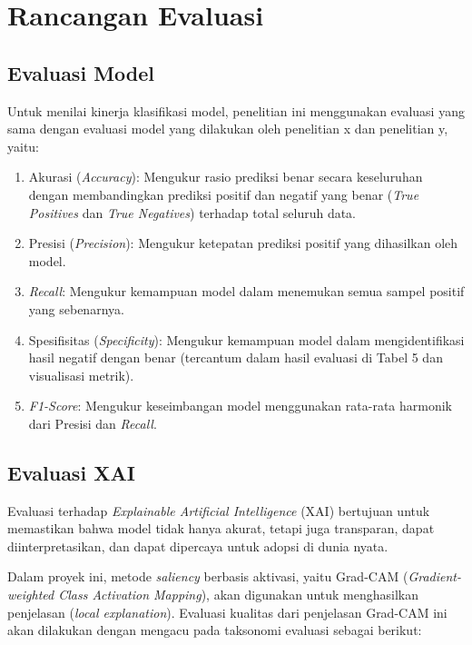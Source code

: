\section{Rancangan Evaluasi}
\subsection{Evaluasi Model}
Untuk menilai kinerja klasifikasi model, penelitian ini menggunakan evaluasi yang sama dengan evaluasi model yang dilakukan oleh penelitian x dan penelitian y, yaitu:

\begin{enumerate}
	\item Akurasi (\textit{Accuracy}):
	Mengukur rasio prediksi benar secara keseluruhan dengan membandingkan prediksi positif dan negatif yang benar (\textit{True Positives} dan \textit{True Negatives}) terhadap total seluruh data.
	
	\item Presisi (\textit{Precision}):
	Mengukur ketepatan prediksi positif yang dihasilkan oleh model.
	
	\item \textit{Recall}:
	Mengukur kemampuan model dalam menemukan semua sampel positif yang sebenarnya.
	
	\item Spesifisitas (\textit{Specificity}):
	Mengukur kemampuan model dalam mengidentifikasi hasil negatif dengan benar (tercantum dalam hasil evaluasi di Tabel 5 dan visualisasi metrik).
	
	\item \textit{F1-Score}:
	Mengukur keseimbangan model menggunakan rata-rata harmonik dari Presisi dan \textit{Recall}.
\end{enumerate}

\subsection{Evaluasi XAI}
Evaluasi terhadap \textit{Explainable Artificial Intelligence} (XAI) bertujuan untuk memastikan bahwa model tidak hanya akurat, tetapi juga transparan, dapat diinterpretasikan, dan dapat dipercaya untuk adopsi di dunia nyata.

Dalam proyek ini, metode \textit{saliency} berbasis aktivasi, yaitu Grad-CAM (\textit{Gradient-weighted Class Activation Mapping}), akan digunakan untuk menghasilkan penjelasan (\textit{local explanation}). Evaluasi kualitas dari penjelasan Grad-CAM ini akan dilakukan dengan mengacu pada taksonomi evaluasi \autocite{kadir2023evaluation} sebagai berikut:

